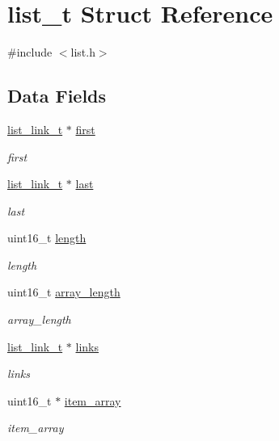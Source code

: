 \hypertarget{structlist__t}{}\section{list\+\_\+t Struct Reference}
\label{structlist__t}


{\ttfamily \#include $<$list.\+h$>$}

\subsection*{Data Fields}
\begin{DoxyCompactItemize}
\item 
\hyperlink{structlist__link__t}{list\+\_\+link\+\_\+t} $\ast$ \hyperlink{structlist__t_ac9669705521df6aa1e4e92369b46619d}{first}
\begin{DoxyCompactList}\small\item\em first \end{DoxyCompactList}\item 
\hyperlink{structlist__link__t}{list\+\_\+link\+\_\+t} $\ast$ \hyperlink{structlist__t_a4a78182ec1f0fe115d1a5dba9bc3341f}{last}
\begin{DoxyCompactList}\small\item\em last \end{DoxyCompactList}\item 
uint16\+\_\+t \hyperlink{structlist__t_a1892eba2086d12ac2b09005aeb09ea3b}{length}
\begin{DoxyCompactList}\small\item\em length \end{DoxyCompactList}\item 
uint16\+\_\+t \hyperlink{structlist__t_a6eb0ced064750a0a9f0b5c6018f16db4}{array\+\_\+length}
\begin{DoxyCompactList}\small\item\em array\+\_\+length \end{DoxyCompactList}\item 
\hyperlink{structlist__link__t}{list\+\_\+link\+\_\+t} $\ast$ \hyperlink{structlist__t_abe18f3666455ade0ae39a85fd76e9f88}{links}
\begin{DoxyCompactList}\small\item\em links \end{DoxyCompactList}\item 
uint16\+\_\+t $\ast$ \hyperlink{structlist__t_a3826fdc3e2faf8cbe23972788ca9c3ba}{item\+\_\+array}
\begin{DoxyCompactList}\small\item\em item\+\_\+array \end{DoxyCompactList}\item 

\end{DoxyCompactItemize}
